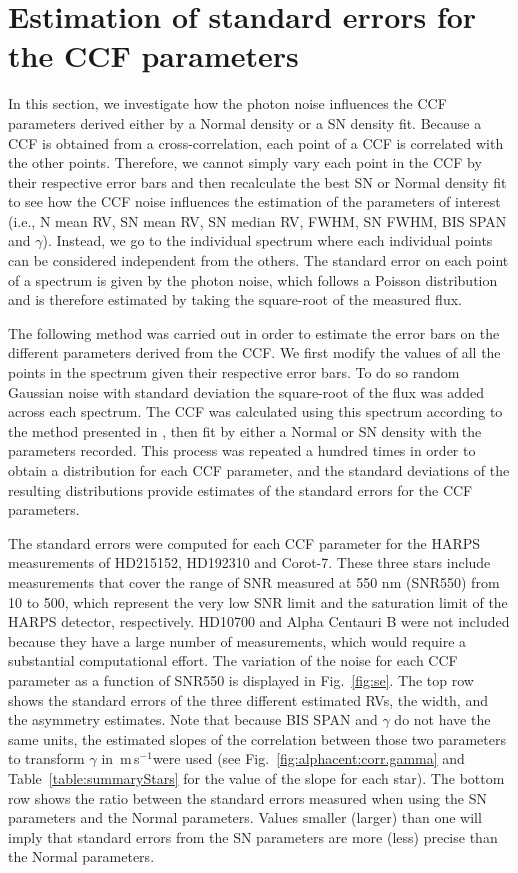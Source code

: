 \documentclass{aa}
\def\ms{\hbox{\,m\,s$^{-1}$}}         %
\begin{document}
\section{Estimation of standard errors for the CCF parameters} \label{sec:5}

In this section, we investigate how the photon noise influences the CCF parameters derived either by a Normal density or a SN density fit. 
Because a CCF is obtained from a cross-correlation, each point of a CCF is correlated with the other points. Therefore, we cannot simply vary each point in the CCF by their respective error bars and then recalculate the best SN or Normal density fit to see how the CCF noise influences the estimation of the parameters of interest (i.e., N mean RV, SN mean RV, SN median RV, FWHM, SN FWHM, BIS SPAN and $\gamma$). 
Instead, we go to the individual spectrum where each individual points can be considered independent from the others.
The standard error on each point of a spectrum is given by the photon noise, which follows a Poisson distribution and is therefore estimated by taking the square-root of the measured flux.

The following method was carried out in order to estimate the error bars on the different parameters derived from the CCF. 
We first modify the values of all the points in the spectrum given their respective error bars. 
To do so random Gaussian noise with standard deviation the square-root of the flux was added across each spectrum. 
The CCF was calculated using this spectrum according to the method presented in \citet{Pepe-2002a}, then fit by either a Normal or SN density with the parameters recorded. 
This process was repeated a hundred times in order to obtain a distribution for each CCF parameter, and the standard deviations of the resulting distributions provide estimates of the standard errors for the CCF parameters.

The standard errors were computed for each CCF parameter for the HARPS measurements of HD215152, HD192310 and Corot-7. 
These three stars include measurements that cover the range of SNR measured at 550 nm (SNR550) from 10 to 500, which represent the very low SNR limit and the saturation limit of the HARPS detector, respectively. 
HD10700 and Alpha Centauri B were not included because they have a large number of measurements, which would require a substantial computational effort.
The variation of the noise for each CCF parameter as a function of SNR550 is displayed in Fig.~\ref{fig:se}.
The top row shows the standard errors of the three different estimated RVs, the width, and the asymmetry estimates. 
Note that because BIS SPAN and $\gamma$ do not have the same units, the estimated slopes of the correlation between those two parameters to transform $\gamma$ in \ms were used (see Fig.~\ref{fig:alphacent:corr.gamma} and Table~\ref{table:summaryStars} for the value of the slope for each star). 
The bottom row shows the ratio between the standard errors measured when using the SN parameters and the Normal parameters. Values smaller (larger) than one will imply that standard errors from the SN parameters are more (less) precise than the Normal parameters.
\end{document}
